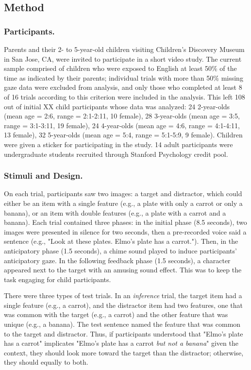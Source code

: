 \documentclass[10pt,letterpaper]{article}
\begin{document}
\subsection{Method}

\subsubsection{Participants.}

Parents and their 2- to 5-year-old children visiting Children's Discovery Museum in San Jose, CA, were invited to participate in a short video study. The current sample comprised of children who were exposed to English at least 50\% of the time as indicated by their parents; individual trials with more than 50\% missing gaze data were excluded from analysis, and only those who completed at least 8 of 16 trials according to this criterion were included in the analysis. This left 108 out of initial XX child participants whose data was analyzed: 24 2-year-olds (mean age = 2:6, range = 2:1-2:11, 10 female), 28 3-year-olds (mean age = 3:5, range = 3:1-3:11, 19 female), 24 4-year-olds (mean age = 4:6, range = 4:1-4:11, 13 female), 32 5-year-olds (mean age = 5:4, range = 5:1-5:9, 9 female). Children were given a sticker for participating in the study. 14 adult participants were undergraduate students recruited through Stanford Psychology credit pool.

\vspace{12pt}

\subsubsection{Stimuli and Design.}

On each trial, participants saw two images: a target and distractor, which could either be an item with a single feature (e.g., a plate with only a carrot or only a banana), or an item with double features (e.g., a plate with a carrot and a banana). Each trial contained three phases: in the initial phase (8.5 seconds), two images were presented in silence for two seconds, then a pre-recorded voice said a sentence (e.g., "Look at these plates. Elmo's plate has a carrot."). Then, in the anticipatory phase (1.5 seconds), a chime sound played to induce participants' anticipatory gaze. In the following feedback phase (1.5 seconds), a character appeared next to the target with an amusing sound effect. This was to keep the task engaging for child participants.

There were three types of test trials. In an \emph{inference} trial, the target item had a single feature (e.g., a carrot), and the distractor item had two features, one that was common with the target (e.g., a carrot) and the other feature that was unique (e.g., a banana). The test sentence named the feature that was common to the target and distractor. Thus, if participants understood that "Elmo's plate has a carrot" implicates "Elmo's plate has a carrot \emph{but not a banana}" given the context, they should look more toward the target than the distractor; otherwise, they should equally to both.
\end{document}
